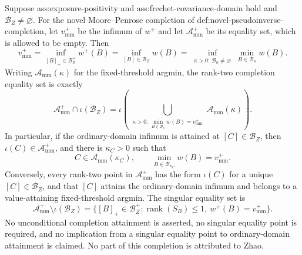 Suppose ass:exposure-positivity and ass:frechet-covariance-domain hold and \(\mathcal B_Z\ne\varnothing\).  For the novel Moore--Penrose completion of def:novel-pseudoinverse-completion, let \(v_{\mathrm{mm}}^+\) be the infimum of \(w^+\) and let \(\mathcal A_{\mathrm{mm}}^+\) be its equality set, which is allowed to be empty.  Then
\[
v_{\mathrm{mm}}^+
=\inf_{[B]_+\in\mathcal B_Z^+}w^+(B)
=\inf_{[B]\in\mathcal B_Z}w(B)
=\inf_{\substack{\kappa>0:\,\mathcal B_\kappa\ne\varnothing}}
\min_{B\in\mathcal B_\kappa}w(B).
\]
Writing \(\mathcal A_{\mathrm{mm}}(\kappa)\) for the fixed-threshold argmin, the rank-two completion equality set is exactly
\[
\mathcal A_{\mathrm{mm}}^+\cap\iota(\mathcal B_Z)
=\iota\!\left(
\bigcup_{\substack{\kappa>0:\,
\min_{B\in\mathcal B_\kappa}w(B)=v_{\mathrm{mm}}^+}}
\mathcal A_{\mathrm{mm}}(\kappa)\right).
\]
In particular, if the ordinary-domain infimum is attained at \([C]\in\mathcal B_Z\), then \(\iota(C)\in\mathcal A_{\mathrm{mm}}^+\), and there is \(\kappa_C>0\) such that
\[
C\in\mathcal A_{\mathrm{mm}}(\kappa_C),
\qquad
\min_{B\in\mathcal B_{\kappa_C}}w(B)=v_{\mathrm{mm}}^+.
\]
Conversely, every rank-two point in \(\mathcal A_{\mathrm{mm}}^+\) has the form \(\iota(C)\) for a unique \([C]\in\mathcal B_Z\), and that \([C]\) attains the ordinary-domain infimum and belongs to a value-attaining fixed-threshold argmin.  The singular equality set is
\[
\mathcal A_{\mathrm{mm}}^+\setminus\iota(\mathcal B_Z)
=\{[B]_+\in\mathcal B_Z^+:\operatorname{rank}(S_B)\le1,\ w^+(B)=v_{\mathrm{mm}}^+\}.
\]
No unconditional completion attainment is asserted, no singular equality point is required, and no implication from a singular equality point to ordinary-domain attainment is claimed.  No part of this completion is attributed to Zhao.